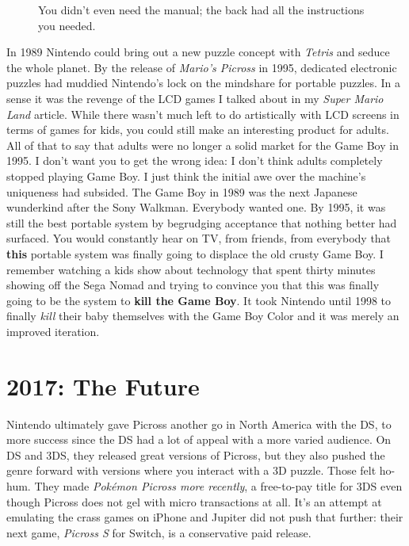 \documentclass{book}
\begin{document}
\FloatBarrier\vspace{\baselineskip}\begin{figure}[H]\caption*{You didn’t even need the manual; the back had all the instructions you needed.}\end{figure}
In 1989 Nintendo could bring out a new puzzle concept with \emph{Tetris} and seduce the whole planet. By the release of \emph{Mario’s Picross} in 1995, dedicated electronic puzzles had muddied Nintendo’s lock on the mindshare for portable puzzles. In a sense it was the revenge of the LCD games I talked about in my \emph{Super Mario Land} article. While there wasn’t much left to do artistically with LCD screens in terms of games for kids, you could still make an interesting product for adults. All of that to say that adults were no longer a solid market for the Game Boy in 1995. I don’t want you to get the wrong idea: I don’t think adults completely stopped playing Game Boy. I just think the initial awe over the machine’s uniqueness had subsided. The Game Boy in 1989 was the next Japanese wunderkind after the Sony Walkman. Everybody wanted one. By 1995, it was still the best portable system by begrudging acceptance that nothing better had surfaced. You would constantly hear on TV, from friends, from everybody that \textbf{this} portable system was finally going to displace the old crusty Game Boy. I remember watching a kids show about technology that spent thirty minutes showing off the Sega Nomad and trying to convince you that this was finally going to be the system to \textbf{kill the Game Boy}. It took Nintendo until 1998 to finally \emph{kill} their baby themselves with the Game Boy Color and it was merely an improved iteration.\par
\FloatBarrier\section*{2017: The Future}
Nintendo ultimately gave Picross another go in North America with the DS, to more success since the DS had a lot of appeal with a more varied audience. On DS and 3DS, they released great versions of Picross, but they also pushed the genre forward with versions where you interact with a 3D puzzle. Those felt ho-hum. They made \emph{Pokémon Picross more recently}, a free-to-pay title for 3DS even though Picross does not gel with micro transactions at all. It’s an attempt at emulating the crass games on iPhone and Jupiter did not push that further: their next game, \emph{Picross S} for Switch, is a conservative paid release.\par
\end{document}
